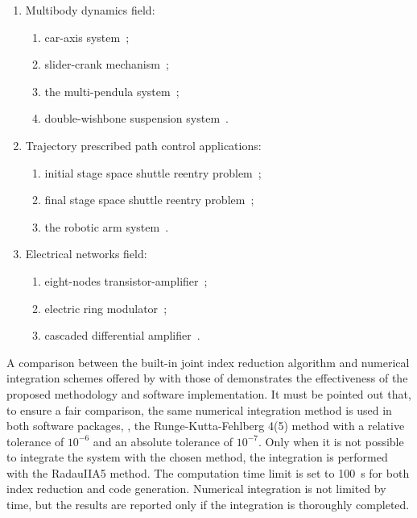 \begin{enumerate}
  \setlength\itemsep{0.0em}
  \item Multibody dynamics field:
  \begin{enumerate}
    \setlength\itemsep{0.0em}
    \item car-axis system~\cite{lioen1998test, mazzia2008test};
    \item slider-crank mechanism~\cite{lioen1998test, mazzia2008test};
    \item the multi-pendula system~\cite{nedialkov2008solvingIII};
    \item double-wishbone suspension system~\cite{lioen1998test, mazzia2008test}.
  \end{enumerate}
  \item Trajectory prescribed path control applications:
  \begin{enumerate}
    \setlength\itemsep{0.0em}
    \item initial stage space shuttle reentry problem~\cite{brenan1995numerical};
    \item final stage space shuttle reentry problem~\cite{brenan1995numerical};
    \item the robotic arm system~\cite{pryce1998solving}.
  \end{enumerate}
  \item Electrical networks field:
  \begin{enumerate}
    \setlength\itemsep{0.0em}
    \item eight-nodes transistor-amplifier~\cite{lioen1998test, mazzia2008test};
    \item electric ring modulator~\cite{lioen1998test, mazzia2008test};
    \item cascaded differential amplifier~\cite{brenan1995numerical}.
  \end{enumerate}
\end{enumerate}

A comparison between the built-in joint index reduction algorithm and numerical integration schemes offered by \Maple{} with those of \Indigo{} demonstrates the effectiveness of the proposed methodology and software implementation. It must be pointed out that, to ensure a fair comparison, the same numerical integration method is used in both software packages, \ie{}, the Runge-Kutta-Fehlberg 4(5) method with a relative tolerance of $10^{-6}$ and an absolute tolerance of $10^{-7}$. Only when it is not possible to integrate the system with the chosen method, the integration is performed with the RadauIIA5 method. The computation time limit is set to \SI{100}{\second} for both index reduction and code generation. Numerical integration is not limited by time, but the results are reported only if the integration is thoroughly completed.


